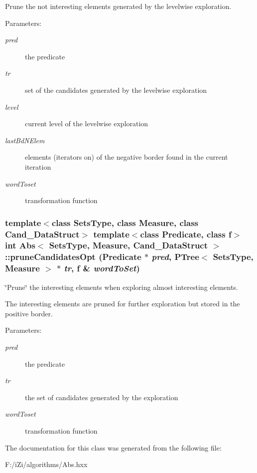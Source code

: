 Prune the not interesting elements generated by the levelwise exploration. 

\begin{Desc}
\item[Parameters:]
\begin{description}
\item[{\em pred}]the predicate \item[{\em tr}]set of the candidates generated by the levelwise exploration \item[{\em level}]current level of the levelwise exploration \item[{\em last\-Bd\-NElem}]elements (iterators on) of the negative border found in the current iteration \item[{\em word\-Toset}]transformation function \end{description}
\end{Desc}
\subsubsection{\setlength{\rightskip}{0pt plus 5cm}template$<$class Sets\-Type, class Measure, class Cand\_\-Data\-Struct$>$ template$<$class Predicate, class f$>$ int {\bf Abs}$<$ Sets\-Type, Measure, Cand\_\-Data\-Struct $>$::prune\-Candidates\-Opt ({\bf Predicate} $\ast$ {\em pred}, {\bf PTree}$<$ Sets\-Type, Measure $>$ $\ast$ {\em tr}, f \& {\em word\-To\-Set})\hspace{0.3cm}{\tt  [protected]}}\label{class_abs_9756459bbd5a86de592167e310c576fa}


\char`\"{}Prune\char`\"{} the interesting elements when exploring almost interesting elements. 

The interesting elements are pruned for further exploration but stored in the positive border.

\begin{Desc}
\item[Parameters:]
\begin{description}
\item[{\em pred}]the predicate \item[{\em tr}]the set of candidates generated by the exploration \item[{\em word\-Toset}]transformation function \end{description}
\end{Desc}


The documentation for this class was generated from the following file:\begin{CompactItemize}
\item 
F:/i\-Zi/algorithms/Abs.hxx\end{CompactItemize}
